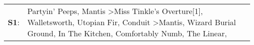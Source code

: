 \begin{supertabular}{p{0.03\textwidth}p{0.92\textwidth}}
 \textbf{S1}:  &  Partyin' Peeps\textsuperscript{}, \enspace Mantis\textsuperscript{} \textgreater \enspace Miss Tinkle's Overture[1]\textsuperscript{}, \enspace Walletsworth\textsuperscript{}, \enspace Utopian Fir\textsuperscript{}, \enspace Conduit\textsuperscript{} \textgreater \enspace Mantis\textsuperscript{}, \enspace Wizard Burial Ground\textsuperscript{}, \enspace In The Kitchen\textsuperscript{}, \enspace Comfortably Numb\textsuperscript{}, \enspace The Linear\textsuperscript{}, \textsuperscript{}  \enspace  \\
\end{supertabular}
